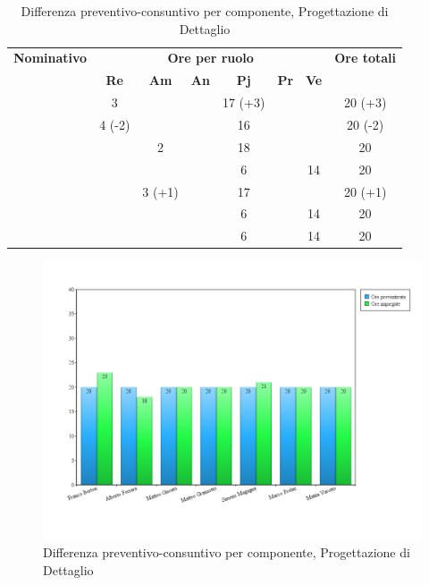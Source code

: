 \begin{table}[H]
	\begin{center}
		\begin{tabular}{|c|c|c|c|c|c|c|c|}
			\hline
			\textbf{Nominativo} & \multicolumn{6}{c|}{\textbf{Ore per ruolo}} & \textbf{Ore totali} \\
			& \textbf{Re} & \textbf{Am} & \textbf{An} & \textbf{Pj} & \textbf{Pr} & \textbf{Ve} & \\
			\hline
			\FB			&	3		&			&		&	17 (+3)	&		&		&	20 (+3)		\\
			\hline
			\AF			&	4 (-2)	&			&		&	16 		&		&		& 	20 (-2)		\\
			\hline
			\GN			&			&	2		&		&	18		&		&		&	20			\\
			\hline
			\GR			&			&	 		&		&	6		&	 	& 	14	&	20			\\
			\hline
			\SM 		&			&	3 (+1)	&		&	17		&		& 		&	20 (+1)		\\
			\hline
			\MP 		& 			&			&		&	6		&		&	14	&	20			\\
			\hline
			\MV 		&			&			&		&	6		&		&	14	& 	20			\\
			\hline
		\end{tabular}
	\end{center}
	\caption{Differenza preventivo-consuntivo per componente, Progettazione di Dettaglio}
\end{table}

\begin{figure}[H]
	\centering
	\includegraphics[scale=0.4]{immagini/Grafi/ProgettazioneDettaglio_oreComponente.png}
	\caption{Differenza preventivo-consuntivo per componente, Progettazione di Dettaglio}
\end{figure}
\FloatBarrier

